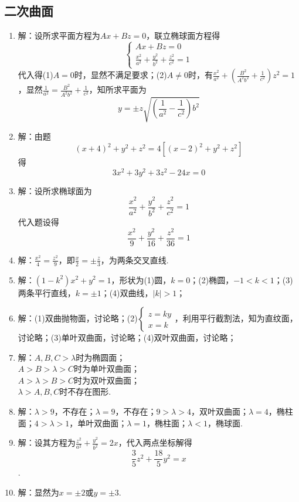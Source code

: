 \documentclass[UTF8]{ctexart}
\begin{document}
\subsection{二次曲面}
\begin{enumerate}
\item 解：设所求平面方程为$Ax+Bz=0$，联立椭球面方程得$$\left\{\begin{array}{l}Ax+Bz=0\\\displaystyle\frac{x^2}{a^2}+\displaystyle\frac{y^2}{b^2}+\displaystyle\frac{z^2}{c^2}=1\end{array}\right.$$代入得(1)$A=0$时，显然不满足要求；(2)$A\neq0$时，有$\displaystyle\frac{x^2}{a^2}+\left(\displaystyle\frac{B^2}{A^2b^2}+\displaystyle\frac{1}{c^2}\right)z^2=1$，显然$\displaystyle\frac{1}{a^2}=\displaystyle\frac{B^2}{A^2b^2}+\displaystyle\frac{1}{c^2}$，知所求平面为$$y=\pm z\sqrt{\left(\frac{1}{a^2}-\frac{1}{c^2}\right)b^2}$$
\item 解：由题$$\left(x+4\right)^2+y^2+z^2=4\left[\left(x-2\right)^2+y^2+z^2\right]$$得$$3x^2+3y^2+3z^2-24x=0$$

\item 解：设所求椭球面为$$\displaystyle\frac{x^2}{a^2}+\displaystyle\frac{y^2}{b^2}+\displaystyle\frac{z^2}{c^2}=1$$代入题设得$$\displaystyle\frac{x^2}{9}+\displaystyle\frac{y^2}{16}+\displaystyle\frac{z^2}{36}=1$$

\item 解：$\displaystyle\frac{x^2}{4}=\displaystyle\frac{z^2}{9}$，即$\displaystyle\frac{x}{2}=\pm\displaystyle\frac{z}{3}$，为两条交叉直线.

\item 解：$\left(1-k^2\right)x^2+y^2=1$，形状为(1)圆，$k=0$；(2)椭圆，$-1<k<1$；(3)两条平行直线，$k=\pm1$；(4)双曲线，$\left|k\right|>1$；

\item 解：(1)双曲抛物面，讨论略；(2)$\left\{\begin{array}{l}z=ky\\x=k\end{array}\right.$，利用平行截割法，知为直纹面，讨论略；(3)单叶双曲面，讨论略；(4)双叶双曲面，讨论略；

\item 解：$A,B,C>\lambda$时为椭圆面；\\
$A>B>\lambda>C$时为单叶双曲面；\\
$A>\lambda>B>C$时为双叶双曲面；\\
$\lambda>A,B,C$时不存在图形. 

\item 解：$\lambda>9$，不存在；$\lambda=9$，不存在；$9>\lambda>4$，双叶双曲面；$\lambda=4$，椭柱面；$4>\lambda>1$，单叶双曲面；$\lambda=1$，椭柱面；$\lambda<1$，椭球面.

\item 解：设其方程为$\displaystyle\frac{z^2}{a^2}+\displaystyle\frac{y^2}{b^2}=2x$，代入两点坐标解得$$\frac{3}{5}z^2+\frac{18}{5}y^2=x$$.

\item 解：显然为$x=\pm2$或$y=\pm3$.
\end{enumerate}
\end{document}
